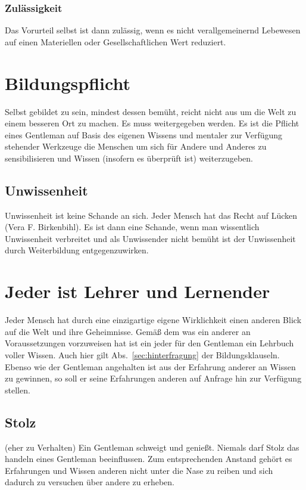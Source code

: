             \subsubsection{Zulässigkeit}
                Das Vorurteil selbst ist dann zulässig, wenn es nicht verallgemeinernd Lebewesen auf einen Materiellen oder Gesellschaftlichen Wert reduziert.

    \section{Bildungspflicht}
        Selbst gebildet zu sein, mindest dessen bemüht, reicht nicht aus um die Welt zu einem besseren Ort zu machen. 
        Es muss weitergegeben werden. 
        Es ist die Pflicht eines Gentleman auf Basis des eigenen Wissens und mentaler zur Verfügung stehender Werkzeuge die Menschen um sich für Andere und Anderes zu sensibilisieren und Wissen (insofern es überprüft ist) weiterzugeben.

        \subsection{Unwissenheit}
            Unwissenheit ist keine Schande an sich. \glqq{} Jeder Mensch hat das Recht auf Lücken\grqq{} (Vera F. Birkenbihl). Es ist dann eine Schande, wenn man wissentlich Unwissenheit verbreitet und als Unwissender nicht bemüht ist der Unwissenheit durch Weiterbildung entgegenzuwirken.

    \section{Jeder ist Lehrer und Lernender}
        Jeder Mensch hat durch eine einzigartige eigene Wirklichkeit einen anderen Blick auf die Welt und ihre Geheimnisse. Gemäß dem was ein anderer an Voraussetzungen vorzuweisen hat ist ein jeder für den Gentleman ein Lehrbuch voller Wissen. Auch hier gilt Abs.~\ref{sec:hinterfragung} der Bildungsklauseln. 
        Ebenso wie der Gentleman angehalten ist aus der Erfahrung anderer an Wissen zu gewinnen, so soll er seine Erfahrungen anderen auf Anfrage hin zur Verfügung stellen.

        \subsection{Stolz} {\color{red} (eher zu Verhalten)}
        Ein Gentleman schweigt und genießt. Niemals darf Stolz das handeln eines Gentleman beeinflussen. Zum entsprechenden Anstand gehört es Erfahrungen und Wissen anderen nicht unter die Nase zu reiben und sich dadurch zu versuchen über andere zu erheben.
